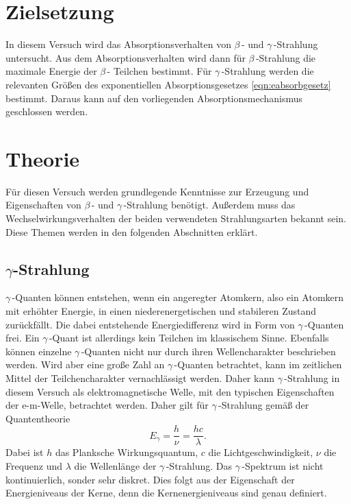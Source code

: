 \section{Zielsetzung}
\label{sec:Ziel}
In diesem Versuch wird das Absorptionsverhalten von $\beta$\,- und $\gamma$\,-Strahlung untersucht. Aus dem Absorptionsverhalten wird dann für $\beta$\,-Strahlung die 
maximale Energie der $\beta$\,- Teilchen bestimmt. Für $\gamma$\,-Strahlung werden die relevanten Größen des exponentiellen Absorptionsgesetzes \ref{eqn:eabsorbgesetz} bestimmt.
Daraus kann auf den vorliegenden Absorptionsmechanismus geschlossen werden.

\section{Theorie}
\label{sec:Theorie}
Für diesen Versuch werden grundlegende Kenntnisse zur Erzeugung und Eigenschaften von $\beta$\,- und $\gamma$\,-Strahlung benötigt. Außerdem muss das Wechselwirkungsverhalten der
beiden verwendeten Strahlungsarten bekannt sein. Diese Themen werden in den folgenden Abschnitten erklärt.

\subsection{\texorpdfstring{$\gamma$-Strahlung}{Gamma-Strahlung}}
\label{subec:Gammastrahlung}
$\gamma$\,-Quanten können entstehen, wenn ein angeregter Atomkern, also ein Atomkern mit erhöhter Energie, in einen niederenergetischen und stabileren Zustand zurückfällt. Die 
dabei entstehende Energiedifferenz wird in Form von $\gamma$\,-Quanten frei. Ein $\gamma$\,-Quant ist allerdings kein Teilchen im klassischem Sinne. Ebenfalls können einzelne
$\gamma$\,-Quanten nicht nur durch ihren Wellencharakter beschrieben werden. Wird aber eine große Zahl an $\gamma$\,-Quanten betrachtet, kann im zeitlichen Mittel der 
Teilchencharakter vernachlässigt werden. Daher kann $\gamma$\,-Strahlung in diesem Versuch als elektromagnetische Welle, mit den typischen Eigenschaften der e-m-Welle,
betrachtet werden. Daher gilt für $\gamma$\,-Strahlung gemäß der Quantentheorie 
\begin{equation*}
    E_{\gamma} = \frac{h}{\nu} = \frac{hc}{\lambda}.
\end{equation*}
Dabei ist $h$ das Planksche Wirkungsquantum, $c$ die Lichtgeschwindigkeit, $\nu$ die Frequenz und $\lambda$ die Wellenlänge der $\gamma$\,-Strahlung. Das $\gamma$\,-Spektrum ist 
nicht kontinuierlich, sonder sehr diskret. Dies folgt aus der Eigenschaft der Energieniveaus der Kerne, denn die Kernenergieniveaus sind genau definiert.

